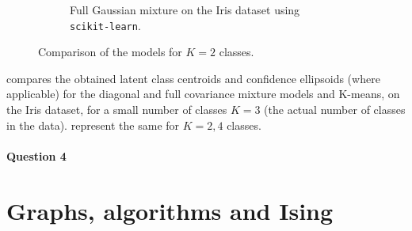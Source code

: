 \documentclass[11pt]{article}
\begin{document}
\begin{figure}
\begin{subfigure}[t]{.8\linewidth}
		\caption{Full Gaussian mixture on the Iris dataset using \texttt{scikit-learn}.}
	\end{subfigure}
	\caption{Comparison of the models for $K=2$ classes.}\label{fig:EMdiagfullComparisonK2}
\end{figure}

 compares the obtained latent class centroids and confidence ellipsoids (where applicable) for the diagonal and full covariance mixture models and K-means, on the Iris dataset, for a small number of classes $K=3$ (the actual number of classes in the data).  represent the same for $K =2, 4$ classes.


\paragraph{Question 4} 



\section{Graphs, algorithms and Ising}
\end{document}
